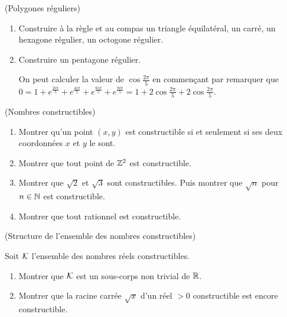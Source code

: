 \documentclass[a4paper,11pt,reqno]{amsart}
\begin{document}
\begin{exo}  (Polygones réguliers)

  \begin{enumerate}
    \item Construire à la règle et au compas un triangle équilatéral, un carré, un hexagone régulier, un octogone régulier.
    \item Construire un pentagone régulier.\\
    \begin{indication}
      On peut calculer la valeur de $\cos \frac{2\pi}{5}$ en commençant par remarquer que $0=1+e^{\frac{2i\pi}{5}}+e^{\frac{4i\pi}{5}}+e^{\frac{6i\pi}{5}}+e^{\frac{8i\pi}{5}}=1+2\cos \frac{2\pi}{5}+2\cos \frac{2\pi}{5}$.
    \end{indication}
  \end{enumerate}
\end{exo}


\begin{exo} (Nombres constructibles)

  \begin{enumerate}
    \item Montrer qu'un point $(x,y)$ est constructible si et seulement si ses deux coordonnées $x$ et $y$ le sont.
    \item Montrer que tout point de $\mathbb{Z}^2$ est constructible.
    \item Montrer que $\sqrt{2}$ et $\sqrt{3}$ sont constructibles. Puis montrer que $\sqrt{n}$ pour $n \in \mathbb{N}$ est constructible.
    \item Montrer que tout rationnel est constructible.
  \end{enumerate}
\end{exo}


\begin{exo}  (Structure de l'ensemble des nombres constructibles)

  Soit $\mathcal K$ l'ensemble  des nombres réels constructibles.
  \begin{enumerate}
    \item Montrer que $\mathcal K$ est un sous-corps non trivial de $\mathbb{R}$.
    \item Montrer que la racine carrée $\sqrt{x}$ d'un réel $>0$ constructible est encore constructible.
  \end{enumerate}
\end{exo}
\end{document}
